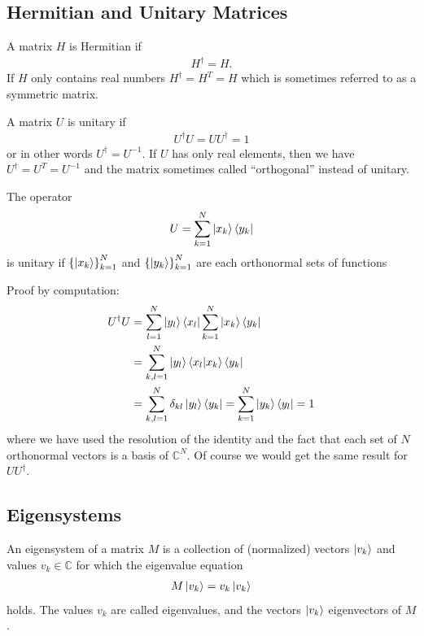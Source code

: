 \subsection{Hermitian and Unitary Matrices}
\begin{def*}
A matrix $H$ is Hermitian if
\begin{align*}
    H^\dagger = H.
\end{align*}
If $H$ only contains real numbers $H^\dagger = H^T = H$ which is sometimes referred to as a symmetric matrix.
\end{def*}
\begin{def*} A matrix $U$ is unitary if
\begin{align*}
    U^\dagger U = U U^\dagger = 1
\end{align*}
or in other words $U^\dagger = U^{-1}$.
If $U$ has only real elements, then we have $U^\dagger = U^T = U^{-1}$ and the matrix sometimes called ``orthogonal'' instead of unitary.
\end{def*}
\begin{theorem*}
    The operator
    \begin{align*}
        U = \sum_{k=1}^{N} \ket{x_k}\bra{y_k}
    \end{align*}
    is unitary if $\left\{\ket{x_k}\right\}_{k=1}^{N}$ and $\left\{\ket{y_k}\right\}_{k=1}^{N}$ are each orthonormal sets of functions
\end{theorem*}
Proof by computation:
\begin{align*}
    U^\dagger U &= \sum_{l=1}^{N} \ket{y_l}\bra{x_l} \sum_{k=1}^{N} \ket{x_k}\bra{y_k} \nonumber\\
    &= \sum_{k,l=1}^N \ket{y_l} \braket{x_l}{x_k}\bra{y_k} \nonumber\\
    &= \sum_{k,l=1}^N \delta_{kl}\ket{y_l}\bra{y_k} = \sum_{k = 1}^N \ket{y_k}\bra{y_l} = 1
\end{align*}
where we have used the resolution of the identity and the fact that each set of $N$ orthonormal vectors is a basis of $\mathbb{C}^N$. Of course we would get the same result for $U U^\dagger$.

\subsection{Eigensystems}

\begin{def*}[eigensystem]
An eigensystem of a matrix $M$ is a collection of (normalized) vectors $\ket{v_k}$ and values $v_k \in \mathbb{C}$ for which the eigenvalue equation
\begin{align*}
    M \ket{v_k} = v_k \ket{v_k}
\end{align*}
holds. The values $v_k$ are called eigenvalues, and the vectors $\ket{v_k}$ eigenvectors of $M$.
\end{def*}

